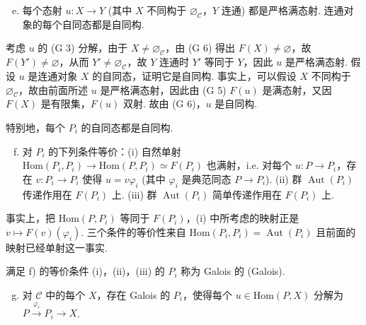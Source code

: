 \begin{enumerate}[a)]
\setcounter{enumi}{4}
\item 每个态射 $u \colon X \to Y$ (其中 $X$ 不同构于 $\varnothing_{\mathcal{C}}$，$Y$ 连通) 都是严格满态射. 连通对象的每个自同态都是自同构.
\end{enumerate}

考虑 $u$ 的 (G 3) 分解，由于 $X \neq \varnothing_{\mathcal{C}}$，由 (G 6) 得出 $F(X) \neq \varnothing$，故 $F(Y') \neq \varnothing$，从而 $Y' \neq \varnothing_{\mathcal{C}}$，故 $Y$ 连通时 $Y'$ 等同于 $Y$，因此 $u$ 是严格满态射. 假设 $u$ 是连通对象 $X$ 的自同态，证明它是自同构. 事实上，可以假设 $X$ 不同构于 $\varnothing_{\mathcal{C}}$，故由前面所述 $u$ 是严格满态射，因此由 (G 5) $F(u)$ 是满态射，又因 $F(X)$ 是有限集，$F(u)$ 双射. 故由 (G 6)，$u$ 是自同构.

特别地，每个 $P_i$ 的自同态都是自同构.

\begin{enumerate}[a)]
\setcounter{enumi}{5}
\item 对 $P_i$ 的下列条件等价：(i) 自然单射 $\mathrm{Hom}(P_i, P_i) \to \mathrm{Hom}(P, P_i) \simeq F(P_i)$ 也满射，i.e. 对每个 $u \colon P \to P_i$，存在 $v \colon P_i \to P_i$ 使得 $u = v\varphi_i$ (其中 $\varphi_i$ 是典范同态 $P \to P_i$). (ii) 群 $\operatorname{Aut}(P_i)$ 传递作用在 $F(P_i)$ 上. (iii) 群 $\operatorname{Aut}(P_i)$ 简单传递作用在 $F(P_i)$ 上.
\end{enumerate}

事实上，把 $\mathrm{Hom}(P, P_i)$ 等同于 $F(P_i)$，(i) 中所考虑的映射正是 $v \mapsto F(v)(\varphi_i)$. 三个条件的等价性来自 $\mathrm{Hom}(P_i, P_i) = \operatorname{Aut}(P_i)$ 且前面的映射已经单射这一事实.

满足 f) 的等价条件 (i)，(ii)，(iii) 的 $P_i$ 称为 Galois 的 (Galois).

\begin{enumerate}[a)]
\setcounter{enumi}{6}
\item 对 $\mathcal{C}$ 中的每个 $X$，存在 Galois 的 $P_i$，使得每个 $u \in \mathrm{Hom}(P, X)$ 分解为 $P \xrightarrow{\varphi_i} P_i \longrightarrow X$.
\end{enumerate}

